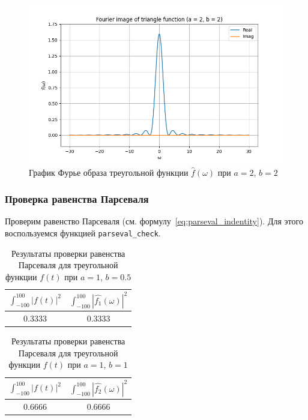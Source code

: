 \begin{figure}[ht!]
    \centering
    \includegraphics[width=\textwidth]{media/triangle_3_image.png}
    \caption{График Фурье образа треугольной функции $\hat{f}(\omega)$ при $a = 2$, $b = 2$}
    \label{fig:triangle_3_image}
\end{figure}

\FloatBarrier
\subsubsection{Проверка равенства Парсеваля}
Проверим равенство Парсеваля (см. формулу~\eqref{eq:parseval_indentity}). Для этого воспользуемся функцией \texttt{parseval\_check}.
\begin{table}[ht!]
    \centering
    \begin{tabular}{|c|c|}
        \hline
        $\displaystyle\int_{-100}^{100}{|f(t)|^2}$ & $\displaystyle\int_{-100}^{100}{|\hat{f_1}(\omega)|^2}$ \\
        \hline
        0.3333 & 0.3333 \\
        \hline
    \end{tabular}
    \caption{Результаты проверки равенства Парсеваля для треугольной функции $f(t)$ при $a = 1$, $b = 0.5$}
    \label{tab:triangle_1_parseval_check}
\end{table}

\begin{table}[ht!]
    \centering
    \begin{tabular}{|c|c|}
        \hline
        $\displaystyle\int_{-100}^{100}{|f(t)|^2}$ & $\displaystyle\int_{-100}^{100}{|\hat{f_2}(\omega)|^2}$ \\
        \hline
        0.6666 & 0.6666 \\
        \hline
    \end{tabular}
    \caption{Результаты проверки равенства Парсеваля для треугольной функции $f(t)$ при $a = 1$, $b = 1$}
    \label{tab:triangle_2_parseval_check}
\end{table}

